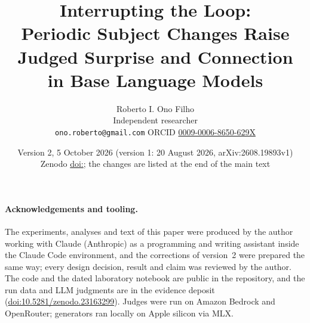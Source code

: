 \documentclass[11pt]{article}
\title{Interrupting the Loop:\\
Periodic Subject Changes Raise Judged Surprise and Connection\\
in Base Language Models}
\author{Roberto I. Ono Filho\\
Independent researcher\\
\texttt{ono.roberto@gmail.com} \quad ORCID \href{https://orcid.org/0009-0006-8650-629X}{0009-0006-8650-629X}}
\date{Version 2, 5 October 2026 (version 1: 20 August 2026, arXiv:2608.19893v1)\\
Zenodo \href{https://doi.org/\thisdoi}{doi:\thisdoi}; the changes are listed at the end of the main text}
\newcommand{\evidencedoi}{10.5281/zenodo.23163299}
\begin{document}
\maketitle

\begin{abstract}

\end{abstract}











\paragraph{Acknowledgements and tooling.} The experiments, analyses and text of this
paper were produced by the author working with Claude (Anthropic) as a
programming and writing assistant inside the Claude Code environment, and the
corrections of version~2 were prepared the same way; every design decision,
result and claim was reviewed by the author. The code and the dated
laboratory notebook are public in the repository, and the run data and LLM
judgments are in the evidence deposit
(\href{https://doi.org/\evidencedoi}{doi:\evidencedoi}).
Judges were run on Amazon Bedrock and OpenRouter; generators ran locally on
Apple silicon via MLX.
\end{document}
